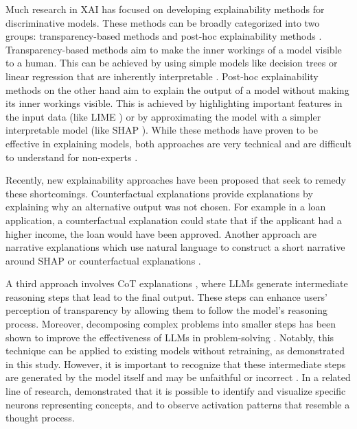 Much research in \ac{XAI} has focused on developing explainability methods for discriminative models. These methods can be broadly categorized into two groups: transparency-based methods and post-hoc explainability methods \parencite{Arieta2020}. Transparency-based methods aim to make the inner workings of a model visible to a human. This can be achieved by using simple models like decision trees or linear regression that are inherently interpretable \parencite{Rudin2019}. Post-hoc explainability methods on the other hand aim to explain the output of a model without making its inner workings visible. This is achieved by highlighting important features in the input data (like LIME \parencite{Ribeiro2016}) or by approximating the model with a simpler interpretable model (like SHAP \parencite{Lundberg2017}). While these methods have proven to be effective in explaining models, both approaches are very technical and are difficult to understand for non-experts \parencite{Martens2025}.

Recently, new explainability approaches have been proposed that seek to remedy these shortcomings. Counterfactual explanations \parencite{Wachter2017} provide explanations by explaining why an alternative output was not chosen. For example in a loan application, a counterfactual explanation could state that if the applicant had a higher income, the loan would have been approved. Another approach are narrative explanations which use natural language to construct a short narrative around SHAP or counterfactual explanations \parencite{Martens2025}.

A third approach involves \ac{CoT} explanations \parencite{Wei2022}, where \acp{LLM} generate intermediate reasoning steps that lead to the final output. These steps can enhance users' perception of transparency by allowing them to follow the model's reasoning process. Moreover, decomposing complex problems into smaller steps has been shown to improve the effectiveness of \acp{LLM} in problem-solving \parencite{Wei2022}. Notably, this technique can be applied to existing models without retraining, as demonstrated in this study. However, it is important to recognize that these intermediate steps are generated by the model itself and may be unfaithful or incorrect \parencite{Turpin2023, Schneider2024}. In a related line of research, \textcite{Lindsey2025} demonstrated that it is possible to identify and visualize specific neurons representing concepts, and to observe activation patterns that resemble a thought process.



